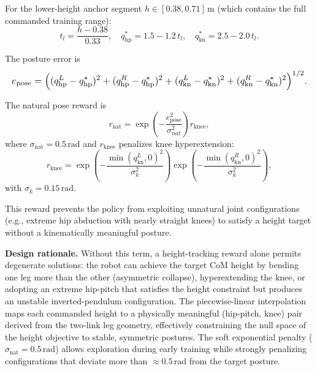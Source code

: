\documentclass[conference]{IEEEtran}
\begin{document}
For the lower-height anchor segment $h \in [0.38, 0.71]\,\mathrm{m}$
(which contains the full commanded training range):
\begin{equation}
t_l = \frac{h - 0.38}{0.33},
\quad
q_{\mathrm{hp}}^* = 1.5 - 1.2\,t_l,
\quad
q_{\mathrm{kn}}^* = 2.5 - 2.0\,t_l.
\end{equation}

The posture error is
\begin{equation}
\resizebox{\columnwidth}{!}{$\displaystyle
e_{\mathrm{pose}} =
\Big(
(q_{\mathrm{hp}}^L - q_{\mathrm{hp}}^*)^2
+
(q_{\mathrm{hp}}^R - q_{\mathrm{hp}}^*)^2
+
(q_{\mathrm{kn}}^L - q_{\mathrm{kn}}^*)^2
+
(q_{\mathrm{kn}}^R - q_{\mathrm{kn}}^*)^2
\Big)^{1/2}.
$}
\end{equation}

The natural pose reward is
\begin{equation}
r_{\mathrm{nat}} =
\exp\!\left(
-\frac{e_{\mathrm{pose}}^2}{\sigma_{nat}^2}
\right)
r_{\mathrm{knee}},
\label{eq:natural_pose}
\end{equation}
where $\sigma_{\mathrm{nat}} = 0.5\,\mathrm{rad}$ and $r_{\mathrm{knee}}$
penalizes knee hyperextension:
\begin{equation}
r_{\mathrm{knee}}=
\exp\!\left(-\frac{\min(q_{\mathrm{kn}}^L,0)^2}{\sigma_k^2}\right)
\exp\!\left(-\frac{\min(q_{\mathrm{kn}}^R,0)^2}{\sigma_k^2}\right),
\end{equation}
with $\sigma_k = 0.15\,\mathrm{rad}$.

This reward prevents the policy from exploiting unnatural joint
configurations (e.g., extreme hip abduction with nearly straight knees)
to satisfy a height target without a kinematically meaningful posture.

\noindent\textbf{Design rationale.}
Without this term, a height-tracking reward alone permits degenerate
solutions: the robot can achieve the target CoM height by bending
one leg more than the other (asymmetric collapse), hyperextending
the knee, or adopting an extreme hip-pitch that satisfies the height
constraint but produces an unstable inverted-pendulum configuration.
The piecewise-linear interpolation maps each commanded height to a
physically meaningful (hip-pitch, knee) pair derived from the
two-link leg geometry, effectively constraining the null space of the
height objective to stable, symmetric postures.
The soft exponential penalty ($\sigma_{\mathrm{nat}} = 0.5\,\mathrm{rad}$)
allows exploration during early training while strongly penalizing
configurations that deviate more than $\approx 0.5\,\mathrm{rad}$
from the target posture.
\end{document}
